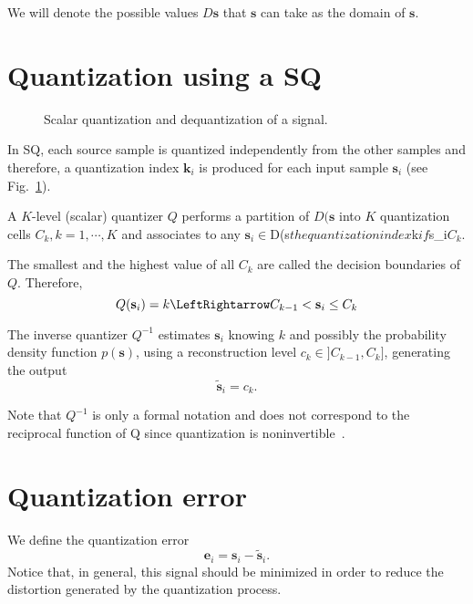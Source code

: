 We will denote the possible values $D{\mathbf s}$ that ${\mathbf s}$ can take as the domain of ${\mathbf s}$.


\section{Quantization using a SQ}

\begin{figure}
  \centering {}
  \caption{Scalar quantization and dequantization of a signal.}
  \label{fig:Q}
\end{figure}

In SQ, each source sample is quantized independently from the other
samples and therefore, a quantization index ${\mathbf k}_i$ is
produced for each input sample ${\mathbf s}_i$ (see
Fig.~\ref{fig:Q}).

A $K$-level (scalar) quantizer $Q$ performs a partition of $D({\mathbf
  s}$ into $K$ quantization cells $C_k, k = 1, \cdots, K$ and
associates to any ${\mathbf s}_i\in $D({\mathbf s}$ the quantization
index $k$ if ${\mathbf s}_i\in $C_k$.

The smallest and the highest value of all $C_k$ are called the
decision boundaries of $Q$. Therefore,
\begin{equation}
  Q({\mathbf s}_i) = k \LeftRightarrow C_{k-1} < {\mathbf s}_i \le C_k
\end{equation}

The inverse quantizer $Q^{-1}$ estimates ${\mathbf s}_i$ knowing $k$ and possibly the probability density function $p({\mathbf s})$, using a reconstruction level $c_k\in ]C_{k-1}, C_k]$, generating the output
\begin{equation}
  \tilde{\mathbf s}_i = c_k.
\end{equation}

Note that $Q^{−1}$ is only a formal notation and does not correspond
to the reciprocal function of Q since quantization is
noninvertible~\cite{duhamel2009joint}.


\section{Quantization error}

We define the quantization error
\begin{equation}
  {\mathbf e}_i = {\mathbf s}_i - \tilde{{\mathbf s}}_i.
\end{equation}
Notice that, in general, this signal should be minimized in order to
reduce the distortion generated by the quantization process.

